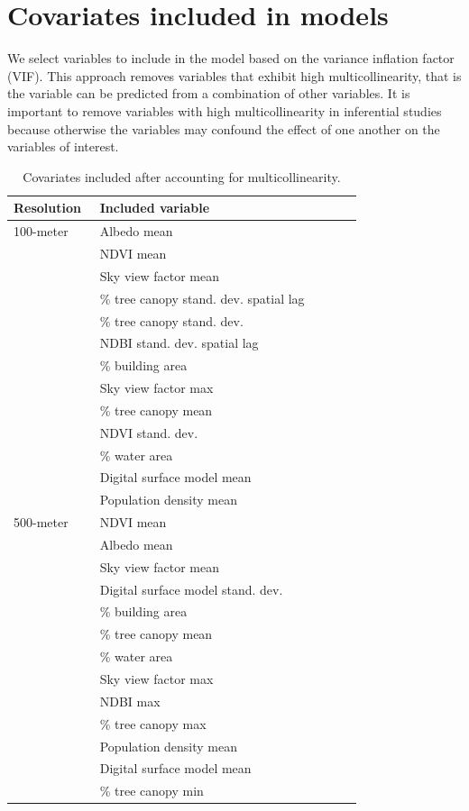 \documentclass[final,3p,times,onecolumn,sort&compress]{elsarticle}
\begin{document}
\newpage
\section{Covariates included in models}


We select variables to include in the model based on the variance inflation factor (VIF). 
This approach removes variables that exhibit high multicollinearity, that is the variable can be predicted from a combination of other variables. 
It is important to remove variables with high multicollinearity in inferential studies because otherwise the variables may confound the effect of one another on the variables of interest.



\begin{table}[h]
\centering
\caption{Covariates included after accounting for multicollinearity.}
\label{tab:vif}
\begin{tabular}{p{0.23\linewidth} p{0.7\linewidth}}
\toprule
       \textbf{Resolution} & \textbf{Included variable} \\
\midrule
100-meter  & Albedo mean \\
& NDVI mean \\
& Sky view factor mean \\
& \% tree canopy stand. dev. spatial lag \\
& \% tree canopy stand. dev. \\
& NDBI stand. dev. spatial lag \\
& \% building area\\
& Sky view factor max \\
& \% tree canopy mean \\
& NDVI stand. dev. \\
& \% water area\\
& Digital surface model mean \\
& Population density mean\\
\hline
500-meter & NDVI mean \\ 
& Albedo mean \\
& Sky view factor mean \\
& Digital surface model stand. dev. \\
& \% building area\\
& \% tree canopy mean \\
& \% water area\\
& Sky view factor max \\
& NDBI max \\
& \% tree canopy max \\
& Population density mean\\
& Digital surface model mean \\
& \% tree canopy min \\
\bottomrule
\end{tabular}
\end{table}
\end{document}
